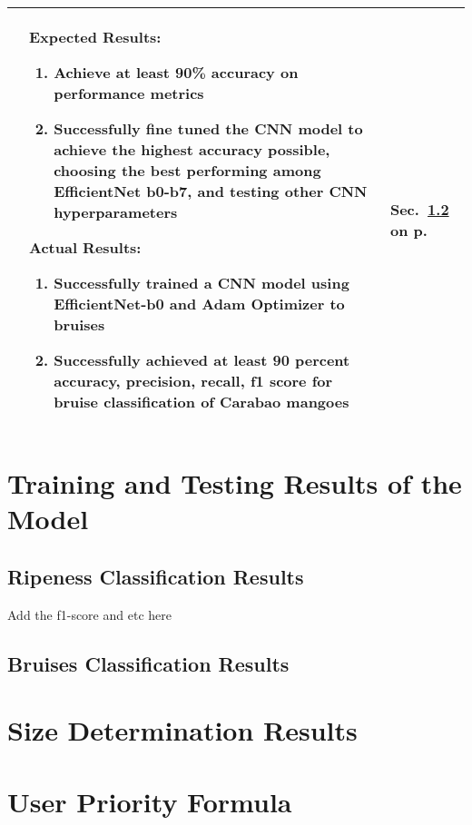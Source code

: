 \begin{center}
{\begin{tabularx}{\textwidth}{p{}|p{}|p{}}
			\Paste{SO7} & 
			Expected Results:
			\begin{enumerate}
				\item Achieve at least 90\% accuracy on performance metrics
				\item Successfully fine tuned the CNN model to achieve the highest accuracy possible, choosing the best performing among EfficientNet b0-b7, and testing other CNN hyperparameters
			\end{enumerate} 
			Actual Results:
			\begin{enumerate}
				\item Successfully trained a CNN model using EfficientNet-b0 and Adam Optimizer to bruises 
				\item Successfully achieved at least 90 percent accuracy, precision, recall, f1 score for bruise classification of Carabao mangoes
			\end{enumerate}
			 & Sec.~\ref{sec:bruisesClassificationResults} on p.~\pageref{sec:bruisesClassificationResults} \\ \hline
			
		\end{tabularx}
	}
\end{center}

\section{Training and Testing Results of the Model} \label{sec:main_trainAndTestResults}

\subsection{Ripeness Classification Results} \label{sec:ripenessClassificationResults}
Add the f1-score and etc here

\subsection{Bruises Classification Results} \label{sec:bruisesClassificationResults}

\section{Size Determination Results} \label{sec:sizeDeterminationResults}

\section{User Priority Formula} \label{sec:userPriorityFormula}

